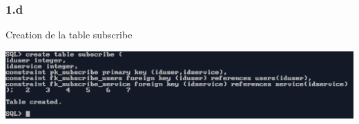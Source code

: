\vspace{0.25cm}
\subsubsection*{1.d}
Creation de la table subscribe



\begin{center}
    \includegraphics[width=\textwidth]{ScreenShot/Partie2/createTable/sub.png}
\end{center}



